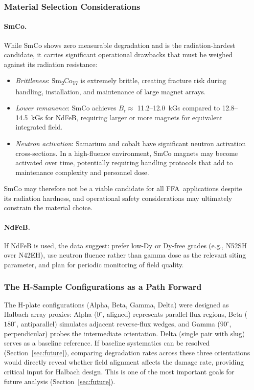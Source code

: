 \documentclass[11pt,letterpaper]{article}
\newcommand{\SmCo}{Sm\textsubscript{2}Co\textsubscript{17}}
\newcommand{\Br}{B_\mathrm{r}}
\newcommand{\FFA}{FFA}
\begin{document}
\subsubsection{Material Selection Considerations}

\paragraph{SmCo.} While SmCo shows zero measurable degradation and is the
radiation-hardest candidate, it carries significant operational drawbacks
that must be weighed against its radiation resistance:
\begin{itemize}
    \item \emph{Brittleness}: \SmCo{} is extremely brittle, creating
    fracture risk during handling, installation, and maintenance of large
    magnet arrays.
    \item \emph{Lower remanence}: SmCo achieves $\Br \approx$
    11.2--\SI{12.0}{kGs} compared to 12.8--\SI{14.5}{kGs} for NdFeB,
    requiring larger or more magnets for equivalent integrated field.
    \item \emph{Neutron activation}: Samarium and cobalt have significant
    neutron activation cross-sections. In a high-fluence environment, SmCo
    magnets may become activated over time, potentially requiring handling
    protocols that add to maintenance complexity and personnel dose.
\end{itemize}
SmCo may therefore not be a viable candidate for all \FFA~applications
despite its radiation hardness, and operational safety considerations
may ultimately constrain the material choice.

\paragraph{NdFeB.} If NdFeB is used, the data suggest: prefer low-Dy or
Dy-free grades (e.g., N52SH over N42EH), use neutron fluence rather than
gamma dose as the relevant siting parameter, and plan for periodic
monitoring of field quality.

\subsubsection{The H-Sample Configurations as a Path Forward}

The H-plate configurations (Alpha, Beta, Gamma, Delta) were designed as
Halbach array proxies: Alpha ($0^\circ$, aligned) represents parallel-flux
regions, Beta ($180^\circ$, antiparallel) simulates adjacent reverse-flux
wedges, and Gamma ($90^\circ$, perpendicular) probes the intermediate
orientation. Delta (single pair with slug) serves as a baseline reference.
If baseline systematics can be resolved (Section~\ref{sec:future}),
comparing degradation rates across these three orientations would directly
reveal whether field alignment affects the damage rate, providing critical
input for Halbach design. This is one of the most important goals for
future analysis (Section~\ref{sec:future}).
\end{document}
